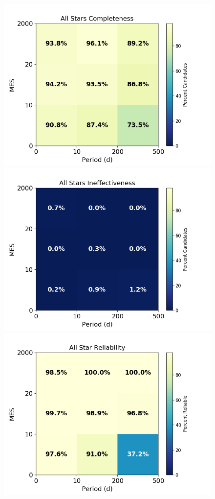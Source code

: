 \begin{figure}[htb]
\begin{center}
\includegraphics[width=\linewidth]{fig-AllCompletePmes.png}
\includegraphics[width=\linewidth]{fig-AllEffect-Pmes.png}
\includegraphics[width=\linewidth]{fig-AllReliabilityPmes.png}

\end{center}
\end{figure}

